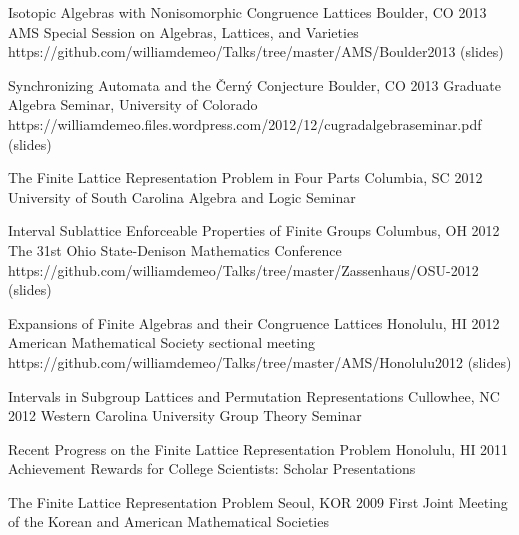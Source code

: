 \talkurl
    {Isotopic Algebras with Nonisomorphic Congruence Lattices}
    {Boulder, CO 2013} %
    {AMS Special Session on Algebras, Lattices, and Varieties}  
    {https://github.com/williamdemeo/Talks/tree/master/AMS/Boulder2013}
    {(slides)}
    
    \vspace{\vsp}

\talkurl
    {Synchronizing Automata and the \v{C}ern\'{y} Conjecture}
    {Boulder, CO 2013}
    {Graduate Algebra Seminar, University of Colorado}
    {https://williamdemeo.files.wordpress.com/2012/12/cugradalgebraseminar.pdf}
    {(slides)}

    \vspace{\vsp}

    \talk
    {The Finite Lattice Representation Problem in Four Parts}
    {Columbia, SC 2012}
    {University of South Carolina Algebra and Logic Seminar}  

    \vspace{\vsp}

\talkurl
    {Interval Sublattice Enforceable Properties of Finite Groups} 
    {Columbus, OH 2012}
    {The 31st Ohio State-Denison Mathematics Conference} 
    {https://github.com/williamdemeo/Talks/tree/master/Zassenhaus/OSU-2012}
    {(slides)}

    \vspace{\vsp}

\talkurl
    {Expansions of Finite Algebras and their Congruence Lattices}
    {Honolulu, HI 2012}
    {American Mathematical Society sectional meeting} 
    {https://github.com/williamdemeo/Talks/tree/master/AMS/Honolulu2012}
    {(slides)}
    
    \vspace{\vsp}

\talk
    {Intervals in Subgroup Lattices and Permutation Representations}
    {Cullowhee, NC 2012}
    {Western Carolina University Group Theory Seminar}  

     \vspace{\vsp}

\talk
    {Recent Progress on the Finite Lattice Representation Problem}
    {Honolulu, HI 2011}
    {Achievement Rewards for College Scientists: Scholar Presentations} 

     \vspace{\vsp}

\talk
    {The Finite Lattice Representation Problem}
    {Seoul, KOR 2009}
    {First Joint Meeting of the Korean and American Mathematical Societies} 



